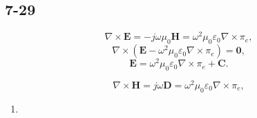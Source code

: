 \documentclass[11pt,a4paper]{article}
\begin{document}
\subsection{7-29}

$$\nabla\times\mathbf{E}=-j\omega\mu_0\mathbf{H}=\omega^2\mu_0\varepsilon_0\nabla\times \pi_e,$$
$$\nabla\times(\mathbf{E}-\omega^2\mu_0\varepsilon_0\nabla\times \pi_e)=\mathbf{0},$$
$$\mathbf{E}=\omega^2\mu_0\varepsilon_0\nabla\times \pi_e+\mathbf{C}.$$

$$\nabla\times\mathbf{H}=j\omega\mathbf{D}=\omega^2\mu_0\varepsilon_0\nabla\times \pi_e,$$

\begin{enumerate}[label=\alph*)]
\item

\end{enumerate}
\end{document}
